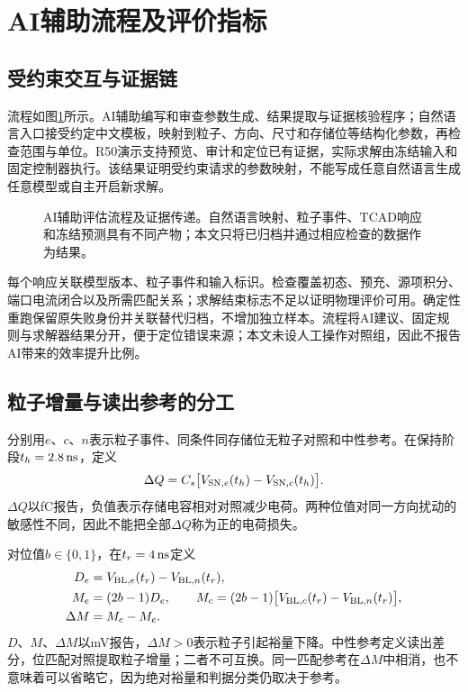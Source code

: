 \section{AI辅助流程及评价指标}
\subsection{受约束交互与证据链}
流程如图\ref{fig:paper-workflow}所示。AI辅助编写和审查参数生成、结果提取与证据核验程序；自然语言入口接受约定中文模板，映射到粒子、方向、尺寸和存储位等结构化参数，再检查范围与单位。R50演示支持预览、审计和定位已有证据，实际求解由冻结输入和固定控制器执行。该结果证明受约束请求的参数映射，不能写成任意自然语言生成任意模型或自主开启新求解。

\begin{figure}[htbp]
\centering

\caption{AI辅助评估流程及证据传递。自然语言映射、粒子事件、TCAD响应和冻结预测具有不同产物；本文只将已归档并通过相应检查的数据作为结果。}
\label{fig:paper-workflow}
\end{figure}

每个响应关联模型版本、粒子事件和输入标识。检查覆盖初态、预充、源项积分、端口电流闭合以及所需匹配关系；求解结束标志不足以证明物理评价可用。确定性重跑保留原失败身份并关联替代归档，不增加独立样本。流程将AI建议、固定规则与求解器结果分开，便于定位错误来源；本文未设人工操作对照组，因此不报告AI带来的效率提升比例。

\subsection{粒子增量与读出参考的分工}
分别用$e$、$c$、$n$表示粒子事件、同条件同存储位无粒子对照和中性参考。在保持阶段$t_h=2.8\,\mathrm{ns}$，定义
\begin{equation}
\Delta Q=C_s\big[V_{{\rm SN},e}(t_h)-V_{{\rm SN},c}(t_h)\big].
\label{eq:paper-dq}
\end{equation}
$\Delta Q$以fC报告，负值表示存储电容相对对照减少电荷。两种位值对同一方向扰动的敏感性不同，因此不能把全部$\Delta Q$称为正的电荷损失。

对位值$b\in\{0,1\}$，在$t_r=4\,\mathrm{ns}$定义
\begin{align}
D_e&=V_{{\rm BL},e}(t_r)-V_{{\rm BL},n}(t_r),\\
M_e&=(2b-1)D_e,\qquad
M_c=(2b-1)\big[V_{{\rm BL},c}(t_r)-V_{{\rm BL},n}(t_r)\big],\\
\Delta M&=M_c-M_e.
\label{eq:paper-margin}
\end{align}
$D$、$M$、$\Delta M$以mV报告，$\Delta M>0$表示粒子引起裕量下降。中性参考定义读出差分，位匹配对照提取粒子增量；二者不可互换。同一匹配参考在$\Delta M$中相消，也不意味着可以省略它，因为绝对裕量和判据分类仍取决于参考。

